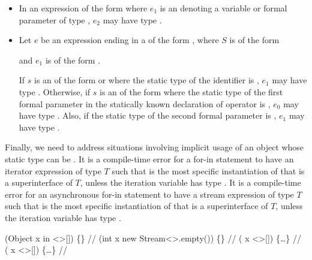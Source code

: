 \documentclass[makeidx]{article}
\begin{document}
{\begin{itemize}
  may have type \VOID.
\item
  In an expression of the form 
  where $e_1$ is an 
  denoting a variable or formal parameter of type \VOID{},
  $e_2$ may have type \VOID.
\item
  Let $e$ be an expression ending in a 
  of the form ,
  where $S$ is of the form

  \noindent

  \noindent
  and $e_1$ is of the form .

  If $s$ is an  of the
  form  or 
  where the static type of the identifier \id{} is \VOID,
  $e_1$ may have type \VOID.
  Otherwise, if $s$ is an  of the form
  \code{[$\,e_0\,$]} where the static type of
  the first formal parameter in the statically known declaration
  of operator \code{[]=} is \VOID,
  $e_0$ may have type \VOID.
  Also, if the static type of the second formal parameter is \VOID,
  $e_1$ may have type \VOID.
\end{itemize}

\LMHash{}%
Finally, we need to address situations involving implicit usage of
an object whose static type can be \VOID{}.
%
It is a compile-time error for a for-in statement to have an iterator
expression of type $T$ such that 
is the most specific instantiation of 
that is a superinterface of $T$, unless the
iteration variable has type \VOID.
%
It is a compile-time error for an asynchronous for-in statement
to have a stream expression of type $T$
such that  is the most specific
instantiation of  that is a superinterface of $T$,
unless the iteration variable has type \VOID.


\begin{dartCode}
\FOR{} (Object x in <\VOID>[]) \{\} // 
\AWAIT{} \FOR{} (int x \IN{} new Stream<\VOID{}>.empty()) \{\} // 
\FOR{} (\VOID{} x \IN{} <\VOID{}>[]) \{\ldots\} // 
\FOR (\VAR{} x \IN{} <\VOID{}>[]) \{\ldots\} // 
\end{dartCode}

}
\end{document}
